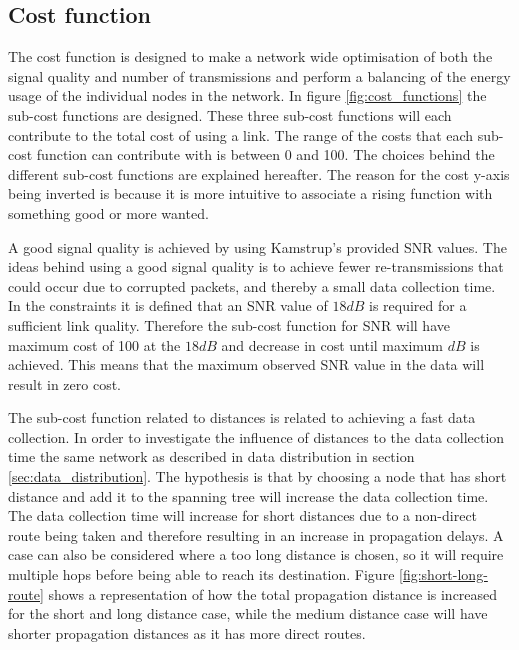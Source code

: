 \subsection{Cost function}
\label{sec:cost_function}
The cost function is designed to make a network wide optimisation of both the signal quality and number of transmissions and perform a balancing of the energy usage of the individual nodes in the network. In figure \ref{fig:cost_functions} the sub-cost functions are designed. These three sub-cost functions will each contribute to the total cost of using a link. The range of the costs that each sub-cost function can contribute with is between 0 and 100. The choices behind the different sub-cost functions are explained hereafter. The reason for the cost y-axis being inverted is because it is more intuitive to associate a rising function with something good or more wanted.


A good signal quality is achieved by using Kamstrup's provided SNR values. The ideas behind using a good signal quality is to achieve fewer re-transmissions that could occur due to corrupted packets, and thereby a small data collection time. In the constraints it is defined that an SNR value of $18dB$ is required for a sufficient link quality. Therefore the sub-cost function for SNR will have maximum cost of 100 at the $18dB$ and decrease in cost until maximum $dB$ is achieved. This means that the maximum observed SNR value in the data will result in zero cost.

The sub-cost function related to distances is related to achieving a fast data collection. In order to investigate the influence of distances to the data collection time the same network as described in data distribution in section \ref{sec:data_distribution}. The hypothesis is that by choosing a node that has short distance and add it to the spanning tree will increase the data collection time. The data collection time will increase for short distances due to a non-direct route being taken and therefore resulting in an increase in propagation delays. A case can also be considered where a too long distance is chosen, so it will require multiple hops before being able to reach its destination. Figure \ref{fig:short-long-route} shows a representation of how the total propagation distance is increased for the short and long distance case, while the medium distance case will have shorter propagation distances as it has more direct routes.

